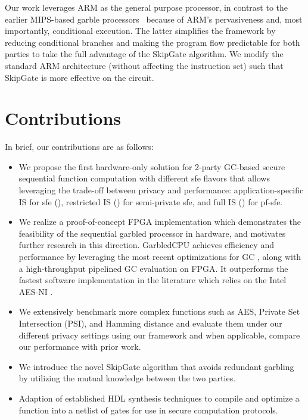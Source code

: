 Our work leverages ARM as the general purpose processor, in contrast to the earlier MIPS-based garble processors~\cite{songhori2015tinygarble, wang2016secure, songhori2016garbledcpu} because of ARM's pervasiveness and, most importantly, conditional execution.
The latter simplifies the framework by reducing conditional branches and making the program flow predictable for both parties to take the full advantage of the SkipGate algorithm.
We modify the standard ARM architecture (without affecting the instruction set) such that SkipGate is more effective on the circuit.

\section{Contributions}
In brief, our contributions are as follows:
\begin{itemize}
\item We propose the first hardware-only solution for 2-party GC-based secure sequential function computation with different \acrshort{sfe} flavors that allows leveraging the trade-off between privacy and performance: application-specific IS for \acrshort{sfe} (), restricted IS () for semi-private \acrshort{sfe}, and full IS () for \acrshort{pf-sfe}.
\item We realize a proof-of-concept FPGA implementation which demonstrates the feasibility of the sequential garbled processor in hardware, and motivates further research in this direction. GarbledCPU achieves efficiency and performance by leveraging the most recent optimizations for GC \cite{kolesnikov2008improved,bellare2013efficient,zahur2015two,songhori2015tinygarble}, along with a high-throughput pipelined GC evaluation on FPGA. It outperforms the fastest software implementation in the literature which relies on the Intel AES-NI \cite{bellare2013efficient}.
\item We extensively benchmark more complex functions such as AES, Private Set Intersection (PSI), and Hamming distance and evaluate them under our different privacy settings using our framework and when applicable, compare our performance with prior work.
\item We introduce the novel SkipGate algorithm that avoids redundant garbling by utilizing the mutual knowledge between the two parties.
\item
  Adaption of established HDL synthesis techniques to compile and optimize a function into a netlist of gates for use in secure computation protocols.

\end{itemize}
